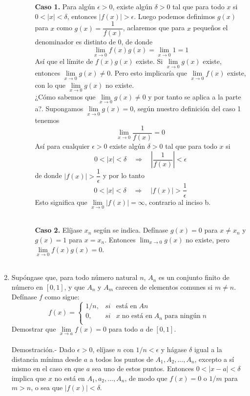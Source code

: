 \begin{enumerate}
\begin{enumerate}[\bfseries (a)]
\begin{enumerate}
	    \item [\bfseries Caso 1. ] Para algún $\epsilon>0$, existe algún $\delta >0$ tal que para todo $x$ si $0<|x|<\delta$, entonces $|f(x)|>\epsilon$. Luego podemos definimos $g(x)$ para $x$ como $g(x)=\dfrac{1}{f(x)}$, aclaremos que para $x$ pequeños el denominador es distinto de $0$, de donde $$\lim_{x\to 0} f(x)g(x)=\lim_{x\to 0} 1 = 1$$
	    Así que el límite de $f(x)g(x)$ existe. Si $\lim\limits_{x\to 0} g(x)$ existe, entonces $\lim\limits_{x\to 0} g(x) \neq 0$. Pero esto implicaría que $\lim\limits_{x\to 0}f(x)$ existe, con lo que $\lim\limits_{x\to 0} g(x)$ no existe. \\
	    ¿Cómo sabemos que $\lim\limits_{x\to 0}g(x)\neq 0$ y por tanto se aplica a la parte a?. Supongamos $\lim\limits_{x\to 0} g(x) = 0$, según nuestro definición del caso 1 tenemos $$\lim_{x\to 0} \dfrac{1}{f(x)} = 0$$
	    Así para cualquier $\epsilon>0$ existe algún $\delta > 0$ tal que para todo $x$ si $$0<|x|<\delta \quad \Longrightarrow \quad \left|\dfrac{1}{f(x)}\right| < \epsilon$$
	    de donde $|f(x)|>\dfrac{1}{\epsilon}$ y por lo tanto $$0<|x|<\delta \quad \Longrightarrow \quad |f(x)|>\dfrac{1}{\epsilon}$$
	    Esto significa que $\lim\limits_{x\to 0} |f(x)| = \infty$, contrario al inciso b.\\\\

	\item [\bfseries Caso 2.] Elíjase $x_n$ según se indica. Defínase $g(x)=0$ para $x\neq x_n$ y $g(x)=1$ para $x=x_n$. Entonces $\lim_{x\to 0} g(x)$ no existe, pero $\lim\limits_{x\to 0} f(x)g(x)=0$.\\\\

	\end{enumerate}

\end{enumerate}

\item Supóngase que, para todo número natural $n$, $A_n$ es un conjunto finito de número en $[0,1]$, y que $A_n$ y $A_m$ carecen de elementos comunes si $m\neq n$. Defínase $f$ como sigue:
$$f(x) = \left\{\begin{array}{rcl}
    1/n,&si&\mbox{está en} \; An\\
    0,&si&x \;\mbox{no está en}\; A_n \;\mbox{para ningún}\; n \\
\end{array}\right.$$
Demostrar que $\lim\limits_{x\to a}f(x)=0$ para todo $a$ de $[0,1]$.\\\\
    Demostración.-\; Dado $\epsilon>0$, elíjase $n$ con $1/n<\epsilon$ y hágase $\delta$ igual a la distancia mínima desde $a$ a todos los puntos de $A_1,A_2,...,A_n$, excepto a sí mismo en el caso en que $a$ sea uno de estos puntos. Entonces $0<|x-a|<\delta$ implica que $x$ no está en $A_1,a_2,...,A_n$, de modo que $f(x)=0$ o $1/m$ para $m>n$, o sea que $|f(x)|<\delta$.\\\\


\end{enumerate}
